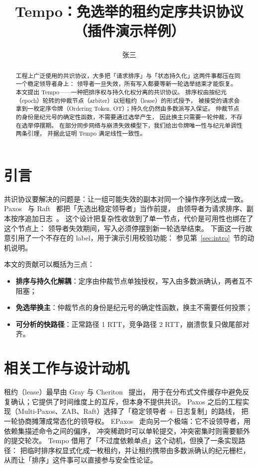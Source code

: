\documentclass[12pt]{ctexart}
\title{Tempo：免选举的租约定序共识协议（插件演示样例）}
\author{张三}
\begin{document}
\maketitle

\begin{abstract}
工程上广泛使用的共识协议，大多把「请求排序」与「状态持久化」这两件事都压在同一个稳定领导者身上：
领导者一旦失效，所有写入都要等新一轮选举结束才能恢复。
本文提出 Tempo——一种把排序权与持久化权分离的共识协议。
排序权由按纪元（epoch）轮转的仲裁节点（arbiter）以短租约（lease）的形式授予，
被接受的请求会拿到一枚定序令牌（Ordering Token, OT）；持久化仍然由多数派写入保证。
仲裁节点的身份是纪元号的确定性函数，不需要通过选举产生，
因此换主只需要一轮仲裁，不存在选举停摆期。
在部分同步网络与崩溃失效模型下，我们给出令牌唯一性与纪元单调性两条引理，
并据此证明 Tempo 满足线性一致性。
\end{abstract}

\section{引言}
共识协议要解决的问题是：让一组可能失效的副本对同一个操作序列达成一致。
Paxos~\cite{lamport1998} 与 Raft~\cite{ongaro2014} 都把「先选出稳定领导者」当作前提，
由领导者为请求排序、副本按序追加日志~\cite{lamport2001}。
这个设计把复杂性收敛到了单一节点，代价是可用性也绑在了这个节点上：
领导者失效期间，写入必须停摆到新一轮选举结束。
下面这一行故意引用了一个不存在的 label，用于演示引用校验功能：
参见第~\ref{sec:intro}~节的动机说明。

本文的贡献可以概括为三点：
\begin{itemize}
  \item \textbf{排序与持久化解耦}：定序由仲裁节点单独授权，写入由多数派确认，两者互不阻塞；
  \item \textbf{免选举换主}：仲裁节点的身份是纪元号的确定性函数，换主不需要任何投票；
  \item \textbf{可分析的快路径}：正常路径 1 RTT，竞争路径 2 RTT，崩溃恢复只做尾部对齐。
\end{itemize}

\section{相关工作与设计动机}\label{sec:related}
租约（lease）最早由 Gray 与 Cheriton~\cite{gray1989} 提出，
用于在分布式文件缓存中避免反复确认；它提供了时间维度上的互斥，但本身不提供共识。
Paxos 之后的工程实现（Multi-Paxos、ZAB、Raft）选择了「稳定领导者 + 日志复制」的路线，
把一轮协商摊薄成常态化的领导权。
EPaxos~\cite{moraru2013} 走向另一个极端：它不设领导者，用依赖集描述命令之间的偏序，
冲突稀疏时可以单轮提交，冲突密集时则需要额外的提交轮次。
Tempo 借用了「不过度依赖单点」这个动机，但换了一条实现路径：
把临时排序权显式化成一枚租约，并让租约携带由多数派确认的纪元栅栏，
从而让「排序」这件事可以直接参与安全性论证。
\end{document}
